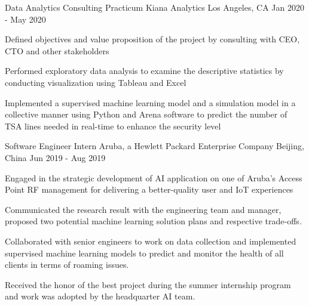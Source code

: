 
\begin{cventries}
  \cventry
    {Data Analytics Consulting Practicum} %
    {Kiana Analytics} %
    {Los Angeles, CA} %
    {Jan 2020 - May 2020} %
    {
      \begin{cvitems} %
        \item {Defined objectives and value proposition of the project by consulting with CEO, CTO and other stakeholders}
        \item {Performed exploratory data analysis to examine the descriptive statistics by conducting visualization using Tableau and Excel}
        \item {Implemented a supervised machine learning model and a simulation model in a collective manner using Python and Arena software to predict the number of TSA lines needed in real-time to enhance the security level}
      \end{cvitems}
    }
    
  \cventry
    {Software Engineer Intern} %
    {Aruba, a Hewlett Packard Enterprise Company} %
    {Beijing, China} %
    {Jun 2019 - Aug 2019} %
    {
      \begin{cvitems} %
        \item {Engaged in the strategic development of AI application on one of Aruba’s Access Point RF management for delivering a better-quality user and IoT experiences}
        \item {Communicated the research result with the engineering team and manager, proposed two potential machine learning solution plans and respective trade-offs.}
        \item {Collaborated with senior engineers to work on data collection and implemented supervised machine learning models to predict and monitor the health of all clients in terms of roaming issues.}
        \item {Received the honor of the best project during the summer internship program and work was adopted by the headquarter AI team.}
      \end{cvitems}
    }


\end{cventries}
